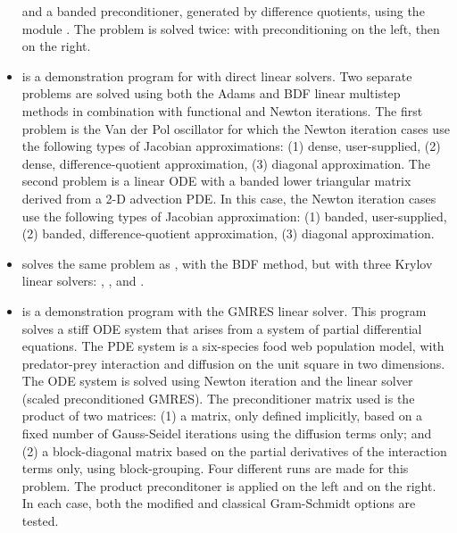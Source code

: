 \begin{itemize}
  and a banded preconditioner, generated by difference quotients, 
  using the module {\cvbandpre}.
  \newline
  The problem is solved twice: with preconditioning on the left,
  then on the right.
\item {}
  is a demonstration program for {\cvodes} with direct linear solvers.
  \newline
  Two separate problems are solved using both the Adams and BDF linear
  multistep methods in combination with functional and Newton
  iterations. 
  \newline
  The first problem is the Van der Pol oscillator for which 
  the Newton iteration cases use the following types of Jacobian approximations:
  (1) dense, user-supplied, (2) dense, difference-quotient approximation, 
  (3) diagonal approximation. The second problem is a linear ODE with a
  banded lower triangular matrix derived from a 2-D advection PDE. In this
  case, the Newton iteration cases use the following types of Jacobian
  approximation: (1) banded, user-supplied, (2) banded, difference-quotient
  approximation, (3) diagonal approximation.
\item {}
  solves the same problem as , with the BDF method, but with
  three Krylov linear solvers: {\cvspgmr}, {\cvspbcg}, and {\cvsptfqmr}.
\item {}
  is a demonstration program with the GMRES linear solver.
  \newline
  This program solves a stiff ODE system that arises from a system     
  of partial differential equations.  The PDE system is a six-species
  food web population model, with predator-prey interaction and diffusion 
  on the unit square in two dimensions.
  \newline
  The ODE system is solved using Newton iteration and the      
  {\cvspgmr} linear solver (scaled preconditioned GMRES).
  \newline
  The preconditioner matrix used is the product of two matrices:         
  (1) a matrix, only defined implicitly, based on a fixed number of     
  Gauss-Seidel iterations using the diffusion terms only; and               
  (2) a block-diagonal matrix based on the partial derivatives of the   
  interaction terms only, using block-grouping.                          
  \newline
  Four different runs are made for this problem.                        
  The product preconditoner is applied on the left and on the right.    
  In each case, both the modified and classical Gram-Schmidt options    
  are tested.


\end{itemize}
